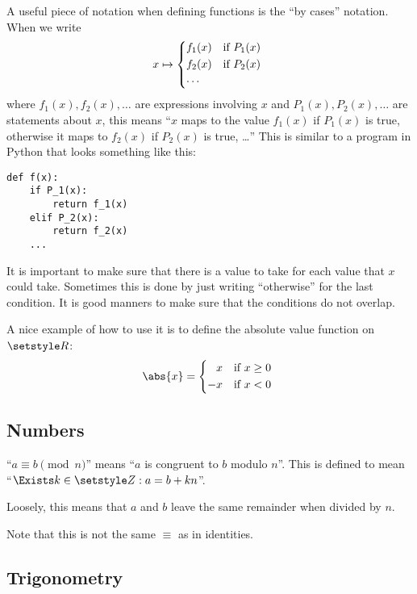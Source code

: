 A useful piece of notation when defining functions is the ``by cases'' notation.
When we write
\begin{equation*}
 x \mapsto
 \begin{cases*}
  f_1(x) & if \(P_1(x)\) \\
  f_2(x) & if \(P_2(x)\) \\
  \dotsb
 \end{cases*}
\end{equation*}
where \(f_1(x), f_2(x), \dotsc\) are expressions involving \(x\) and
\(P_1(x), P_2(x), \dotsc\) are statements about \(x\), this means
``\(x\) maps to the value \(f_1(x)\) if \(P_1(x)\) is true, otherwise it maps to
\(f_2(x)\) if \(P_2(x)\) is true, \dots''
This is similar to a program in Python that looks something like this:
\begin{verbatim}
def f(x):
    if P_1(x):
        return f_1(x)
    elif P_2(x):
        return f_2(x)
    ...
\end{verbatim}
It is important to make sure that there is a value to take for each value that
\(x\) could take. Sometimes this is done by just writing ``otherwise'' for the
last condition. It is good manners to make sure that the conditions do not
overlap.

A nice example of how to use it is to define the absolute value function on
\(\Reals\):
\begin{equation*}
 \abs{x} =
 \begin{cases*}
  \phantom{-}x & if \(x \ge 0\) \\
  -x & if \(x < 0\)
 \end{cases*}
\end{equation*}

\subsection*{Numbers}

``\(a \equiv b \pmod n\)'' means ``\(a\) is congruent to \(b\) modulo \(n\)''.
This is defined to mean \\
``\(\Exists k \in \Integers : a = b + kn\)''.

Loosely, this means that \(a\) and \(b\) leave the same remainder when divided
by \(n\).

Note that this is not the same \(\equiv\) as in identities.

\subsection*{Trigonometry}


